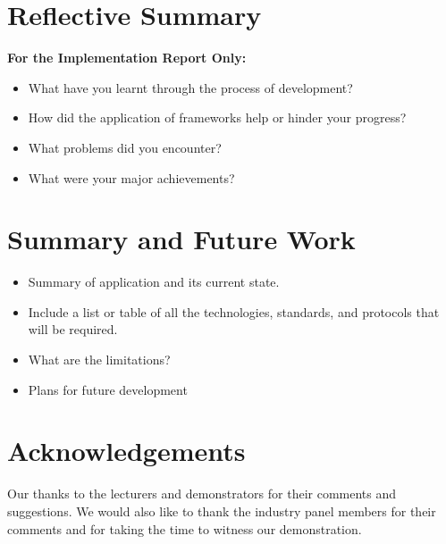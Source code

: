 \documentclass{sig-alt-release2}
\begin{document}
\section{Reflective Summary}
{\bf For the Implementation Report Only:}
\begin{itemize}
\item	What have you learnt through the process of development? 
\item	How did the application of frameworks help or hinder your progress? 
\item	What problems did you encounter? 
\item	What were your major achievements?
\end{itemize}

\section{Summary and Future Work}
\begin{itemize}
\item	Summary of application and its current state.
\item	Include a list or table of all the technologies, standards, and protocols that will be required.
\item	What are the limitations?
\item Plans for future development
\end{itemize}

\section{Acknowledgements}
Our thanks to the lecturers and demonstrators for their comments and
suggestions.
We would also like to thank the industry panel members for their
comments and for taking the time to witness our demonstration.



\end{document}

